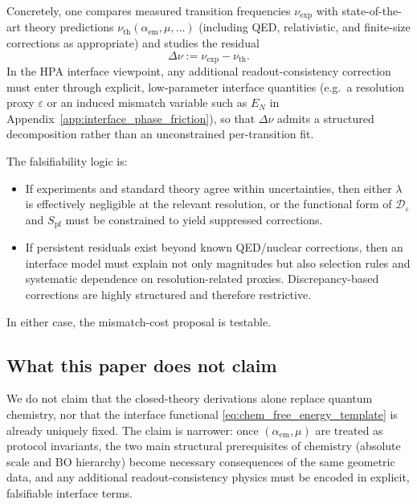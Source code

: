 Concretely, one compares measured transition frequencies $\nu_{\mathrm{exp}}$ with state-of-the-art theory predictions $\nu_{\mathrm{th}}(\alpha_{\mathrm{em}},\mu,\ldots)$ (including QED, relativistic, and finite-size corrections as appropriate) and studies the residual
\[
\Delta\nu := \nu_{\mathrm{exp}}-\nu_{\mathrm{th}}.
\]
In the HPA interface viewpoint, any additional readout-consistency correction must enter through explicit, low-parameter interface quantities (e.g.\ a resolution proxy $\varepsilon$ or an induced mismatch variable such as $E_N$ in Appendix~\ref{app:interface_phase_friction}), so that $\Delta\nu$ admits a structured decomposition rather than an unconstrained per-transition fit.

The falsifiability logic is:
\begin{itemize}
\item If experiments and standard theory agree within uncertainties, then either $\lambda$ is effectively negligible at the relevant resolution, or the functional form of $\mathcal{D}_\varepsilon$ and $S_{\mathrm{pf}}$ must be constrained to yield suppressed corrections.
\item If persistent residuals exist beyond known QED/nuclear corrections, then an interface model must explain not only magnitudes but also selection rules and systematic dependence on resolution-related proxies. Discrepancy-based corrections are highly structured and therefore restrictive.
\end{itemize}
In either case, the mismatch-cost proposal is testable.

\subsection{What this paper does not claim}
We do not claim that the closed-theory derivations alone replace quantum chemistry, nor that the interface functional \eqref{eq:chem_free_energy_template} is already uniquely fixed. The claim is narrower: once $(\alpha_{\mathrm{em}},\mu)$ are treated as protocol invariants, the two main structural prerequisites of chemistry (absolute scale and BO hierarchy) become necessary consequences of the same geometric data, and any additional readout-consistency physics must be encoded in explicit, falsifiable interface terms.


